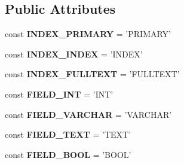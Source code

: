 \subsection*{Public Attributes}
\begin{DoxyCompactItemize}
\item 
\hypertarget{classModel_ab37a4ee78ce10660122475f2f1d27fa9}{
const {\bfseries INDEX\_\-PRIMARY} = 'PRIMARY'}
\label{classModel_ab37a4ee78ce10660122475f2f1d27fa9}

\item 
\hypertarget{classModel_a641dddb8487a7bda77bfe975c85c2528}{
const {\bfseries INDEX\_\-INDEX} = 'INDEX'}
\label{classModel_a641dddb8487a7bda77bfe975c85c2528}

\item 
\hypertarget{classModel_a84b1d7c7fb2084244252166daed2a93a}{
const {\bfseries INDEX\_\-FULLTEXT} = 'FULLTEXT'}
\label{classModel_a84b1d7c7fb2084244252166daed2a93a}

\item 
\hypertarget{classModel_ae14f9ee9db585fb48c182e8fe185c5cd}{
const {\bfseries FIELD\_\-INT} = 'INT'}
\label{classModel_ae14f9ee9db585fb48c182e8fe185c5cd}

\item 
\hypertarget{classModel_a6da935295128cd12387e4d73bb0a83e9}{
const {\bfseries FIELD\_\-VARCHAR} = 'VARCHAR'}
\label{classModel_a6da935295128cd12387e4d73bb0a83e9}

\item 
\hypertarget{classModel_adc7733899124c4dafac510c49714aa7f}{
const {\bfseries FIELD\_\-TEXT} = 'TEXT'}
\label{classModel_adc7733899124c4dafac510c49714aa7f}

\item 
\hypertarget{classModel_a3feb4cc8cad0c26050ba1816ec5968eb}{
const {\bfseries FIELD\_\-BOOL} = 'BOOL'}
\label{classModel_a3feb4cc8cad0c26050ba1816ec5968eb}

\end{DoxyCompactItemize}
